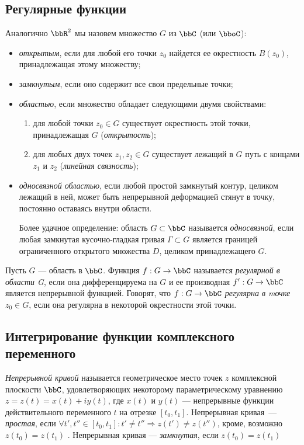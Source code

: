 \subsection{Регулярные функции}
Аналогично $\bbR^2$ мы назовем множество $G$ из $\bbC$ (или $\bboC$):
\begin{itemize}
\item
\textit{открытым}, если для любой его точки $z_0$ найдется ее окрестность $B(z_0)$, принадлежащая этому множеству;
\item
\textit{замкнутым}, если оно содержит все свои предельные точки;
\item 
\textit{областью}, если множество обладает следующими двумя свойствами:
\begin{enumerate}
\item 
для любой точки $z_0 \in G$ существует окрестность этой точки, принадлежащая $G$ (\textit{открытость});
\item 
для любых двух точек $z_1,z_2 \in G$ существует лежащий в $G$ путь с концами $z_1$ и $z_2$ (\textit{линейная связность});
\end{enumerate}
\item
\textit{односвязной областью}, если любой простой замкнутый контур, целиком лежащий в ней, может быть непрерывной деформацией стянут в точку, постоянно оставаясь внутри области. 

Более удачное определение: область $G\subset \bbC$ называется \textit{односвязной}, если любая замкнутая кусочно-гладкая гривая $\Gamma \subset G$ является границей ограниченного открытого множества $D$, целиком принадлежащего $G$.
\end{itemize}

\begin{defn}
Пусть $G$ --- область в $\bbC$. Функция $f: G \to \bbC$ называется \textit{регулярной в области G}, если она дифференцируема на $G$ и ее производная $f' : G \to \bbC$ является непрерывной функцией. Говорят, что $f : G \to \bbC$ \textit{регулярна в mочке} $z_0 \in G$, если она регулярна в некоторой окрестности этой точки. 
\end{defn}


\subsection{Интегрирование функции комплексного переменного}
\begin{defn}
\textit{Непрерывной кривой} называется геометрическое место точек $z$ комплексной плоскости $\bbC$, удовлетворяющих некоторому параметрическому уравнению $z=z(t) = x(t) + iy(t)$, где $x(t)$ и $y(t)$ --- непрерывные функции действительного переменного $t$ на отрезке $[t_0,t_1]$. Непрерывная кривая~--- \textit{простая}, если $\forall t',t'' \in [t_0,t_1]: t'\ne t'' \Rightarrow z(t') \ne z(t'')  $, кроме, возможно $z(t_0) = z(t_1)$ . Непрерывная кривая --- \textit{замкнутая}, если  $z(t_0) = z(t_1)$ 
\end{defn}

